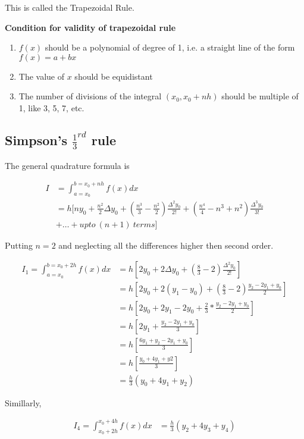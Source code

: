 \documentclass[11pt, a4paper]{article}
\begin{document}
This is called the Trapezoidal Rule.

\textbf{Condition for validity of trapezoidal rule}
\begin{enumerate}
  \item $f(x)$ should be a polynomial of degree of 1, i.e. a 
    straight line of the form $f(x)=a+bx$
  \item The value of $x$ should be equidistant
  \item The number of divisions of the integral $(x_0,x_0+nh)$ 
    should be multiple of 1, like 3, 5, 7, etc.
\end{enumerate}

\subsection{Simpson's $\frac{1}{3}^{rd}$ rule}
The general quadrature formula is 

\begin{align*}
  I &=\int_{a=x_0}^{b=x_0+nh}f(x)dx\\
    &= h[ny_0+\frac{n^2}{2}\Delta y_0+(\frac{n^3}{3}-\frac{n^2}{2})\frac{\Delta^2y_0}{2!}+(\frac{n^4}{4}-n^3+n^2)\frac{\Delta^3y_0}{3!}\\
    &+ \dots+upto\ (n+1)\ terms]
\end{align*}

Putting $n=2$ and neglecting all the differences higher then second order.

\begin{align*}
  I_1=\int_{a=x_0}^{b=x_0+2h}f(x)dx &= h[2y_0+2\Delta y_0+(\frac{8}{3}-2)\frac{\Delta^2y_0}{2!}]\\
                                    &= h[2y_0+2(y_1-y_0)+(\frac{8}{3}-2)\frac{y_2-2y_1+y_0}{2}]\\
                                    &= h[2y_0+2y_1-2y_0+\frac{2}{3}*\frac{y_2-2y_1+y_0}{2}]\\
                                    &= h[2y_1+\frac{y_2-2y_1+y_0}{3}]\\
                                    &= h[\frac{6y_1+y_2-2y_1+y_0}{3}]\\
                                    &= h[\frac{y_0+4y_1+y2}{3}]\\
                                    &= \frac{h}{3}(y_0+4y_1+y_2)
\end{align*}

Simillarly,

\begin{align*}
  I_4=\int_{x_0+2h}^{x_0+4h}f(x)dx &= \frac{h}{3}(y_2+4y_3+y_4)
\end{align*}
\end{document}
